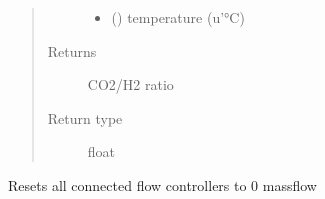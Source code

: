 \documentclass[letterpaper,10pt,english]{sphinxmanual}
\begin{document}
\begin{fulllineitems}
\begin{fulllineitems}
\begin{quote}
\begin{description}
\begin{itemize}
\item {} 
 (\sphinxstyleliteralemphasis{\sphinxupquote{, }}) \textendash{} temperature (u’°C)

\end{itemize}

\item[{Returns}] \leavevmode
CO2/H2 ratio

\item[{Return type}] \leavevmode
float

\end{description}\end{quote}

\end{fulllineitems}


\begin{fulllineitems}
\label{\detokenize{drivers:drivers.MFC.reset}}
Resets all connected flow controllers to 0 massflow

\end{fulllineitems}


\end{fulllineitems}

\end{document}
